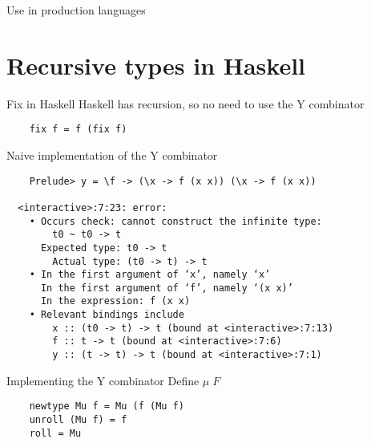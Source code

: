 \documentclass[10pt]{beamer}
\newcommand{\app}[2]{#1 \; #2}
\begin{document}
\begin{frame}[fragile]{Use in production languages}
  \begin{itemize}
  \end{itemize}
\end{frame}

\section{Recursive types in Haskell}

\begin{frame}[fragile]{Fix in Haskell}
  Haskell has recursion, so no need to use the Y combinator
  \begin{verbatim}
    fix f = f (fix f)
  \end{verbatim}
\end{frame}

\begin{frame}[fragile]{Naive implementation of the Y combinator}
  \begin{verbatim}
    Prelude> y = \f -> (\x -> f (x x)) (\x -> f (x x))

  <interactive>:7:23: error:
    • Occurs check: cannot construct the infinite type:
        t0 ~ t0 -> t
      Expected type: t0 -> t
        Actual type: (t0 -> t) -> t
    • In the first argument of ‘x’, namely ‘x’
      In the first argument of ‘f’, namely ‘(x x)’
      In the expression: f (x x)
    • Relevant bindings include
        x :: (t0 -> t) -> t (bound at <interactive>:7:13)
        f :: t -> t (bound at <interactive>:7:6)
        y :: (t -> t) -> t (bound at <interactive>:7:1)
  \end{verbatim}
\end{frame}

\begin{frame}[fragile]{Implementing the Y combinator}
Define $\app{\mu}{F}$
  \begin{verbatim}
    newtype Mu f = Mu (f (Mu f)
    unroll (Mu f) = f
    roll = Mu
  \end{verbatim}
\end{frame}
\end{document}
